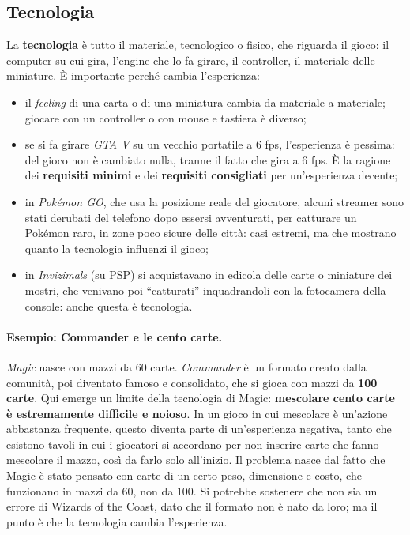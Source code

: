 \subsection{Tecnologia}

La \textbf{tecnologia} è tutto il materiale, tecnologico o fisico, che riguarda
il gioco: il computer su cui gira, l'engine che lo fa girare, il controller, il
materiale delle miniature. È importante perché cambia l'esperienza:
\begin{itemize}
  \item il \emph{feeling} di una carta o di una miniatura cambia da materiale a
        materiale; giocare con un controller o con mouse e tastiera è diverso;
  \item se si fa girare \emph{GTA V} su un vecchio portatile a 6 fps,
        l'esperienza è pessima: del gioco non è cambiato nulla, tranne il fatto
        che gira a 6 fps. È la ragione dei \textbf{requisiti minimi} e dei
        \textbf{requisiti consigliati} per un'esperienza decente;
  \item in \emph{Pokémon GO}, che usa la posizione reale del giocatore, alcuni
        streamer sono stati derubati del telefono dopo essersi avventurati, per
        catturare un Pokémon raro, in zone poco sicure delle città: casi
        estremi, ma che mostrano quanto la tecnologia influenzi il gioco;
  \item in \emph{Invizimals} (su PSP) si acquistavano in edicola delle carte o
        miniature dei mostri, che venivano poi ``catturati'' inquadrandoli con
        la fotocamera della console: anche questa è tecnologia.
\end{itemize}

\paragraph{Esempio: Commander e le cento carte.} \emph{Magic} nasce con mazzi
da 60 carte. \emph{Commander} è un formato creato dalla comunità, poi diventato
famoso e consolidato, che si gioca con mazzi da \textbf{100 carte}. Qui emerge
un limite della tecnologia di Magic: \textbf{mescolare cento carte è
estremamente difficile e noioso}. In un gioco in cui mescolare è un'azione
abbastanza frequente, questo diventa parte di un'esperienza negativa, tanto che
esistono tavoli in cui i giocatori si accordano per non inserire carte che
fanno mescolare il mazzo, così da farlo solo all'inizio. Il problema nasce dal
fatto che Magic è stato pensato con carte di un certo peso, dimensione e costo,
che funzionano in mazzi da 60, non da 100. Si potrebbe sostenere che non sia un
errore di Wizards of the Coast, dato che il formato non è nato da loro; ma il
punto è che la tecnologia cambia l'esperienza.

